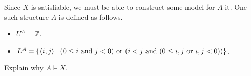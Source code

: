 Since $X$ is satisfiable, we must be able to construct some model for $A$ it. One such structure $A$ is defined as follows. 

\begin{itemize}
\item
$U^A=  \mathbb{Z}$.
\item
$L^A=\{\mbox{$\langle i,j \rangle$}\mid (0\leq i\mbox{ and } j<0)\mbox{ or }(i<j \mbox{ and }  (0\leq i,j\mbox{ or } i,j<0))\}$.
\end{itemize}

\begin{aside}
    Explain why $A \models X$. 
\end{aside}
